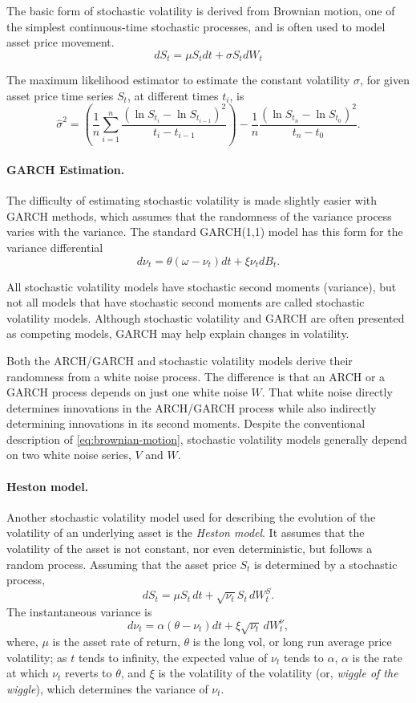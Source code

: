 The basic form of stochastic volatility is derived from Brownian motion, one of the simplest continuous-time stochastic processes, and is often used to model asset price movement.
\begin{equation}
dS_t = \mu S_t dt + \sigma S_t dW_t
\label{eq:brownian-motion}
\end{equation}

The maximum likelihood estimator to estimate the constant volatility $\sigma$, for given asset price time series $S_t$, at different times $t_i$, is 
\[
\hat{\sigma}^2= \left(\frac{1}{n} \sum_{i=1}^n \frac{(\ln S_{t_i}- \ln S_{t_{i-1}})^2}{t_i-t_{i-1}} \right) - \frac{1}{n} \frac{(\ln S_{t_n}- \ln S_{t_0})^2}{t_n-t_0}.
\]

\paragraph{GARCH Estimation.} The difficulty of estimating stochastic volatility is made slightly easier with GARCH methods, which assumes that the randomness of the variance process varies with the variance. The standard GARCH(1,1) model has this form for the variance differential
\[
d \nu_t = \theta(\omega - \nu_t )dt + \xi \nu_t dB_t .
\]

All stochastic volatility models have stochastic second moments (variance), but not all models that have stochastic second moments are called stochastic volatility models. Although stochastic volatility and GARCH are often presented as competing models, GARCH may help explain changes in volatility.

Both the ARCH/GARCH and stochastic volatility models derive their randomness 
from a white noise process. The difference is that an ARCH or a GARCH process depends 
on just one white noise $W$. That white noise directly determines innovations in the ARCH/GARCH process while also indirectly determining innovations in its second moments. Despite the conventional description of \eqref{eq:brownian-motion}, stochastic volatility models generally depend on two white noise series, $V$ and $W$.

\paragraph{Heston model.} Another stochastic volatility model used for describing the evolution of the volatility of an underlying asset is the \emph{Heston model}. It assumes that the volatility of the asset is not constant, nor even deterministic, but follows a random process. Assuming that the asset price $S_t$ is determined by a stochastic process,
\[
dS_t = \mu S_t\,dt + \sqrt{\nu_t} S_t\,dW^S_t.
\]
The instantaneous variance is
\[
d\nu_t = \alpha(\theta - \nu_t)dt + \xi \sqrt{\nu_t}\,dW^{\nu}_t,
\]
where,
$\mu$ is the asset rate of return, $\theta$ is the long vol, or long run average price volatility; as $t$ tends to infinity, the expected value of $\nu_t$ tends to $\alpha$, $\alpha$ is the rate at which $\nu_t$ reverts to $\theta$, and $\xi$ is the volatility of the volatility (or, \emph{wiggle of the wiggle}), which determines the variance of $\nu_t$.
